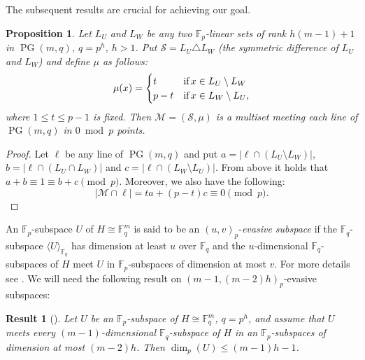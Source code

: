 \documentclass[12pt]{article}
\newcommand{\cM}{{\mathcal M}}
\newcommand{\cS}{{\mathcal S}}
\newcommand{\F}{{\mathbb F}}
\newtheorem{proposition}[theorem]{Proposition}
\newtheorem{result}[theorem]{Result}
\DeclareMathOperator{\PG}{{PG}}
\begin{document}
The subsequent results are crucial for achieving our goal.

\begin{proposition}
	\label{prop1}
	Let $L_U$ and $L_W$ be any two $\F_p$-linear sets of rank $h(m-1)+1$ in $\PG(m,q)$, $q=p^h$, $h>1$. Put $\cS=L_U \triangle L_W$ (the symmetric difference of $L_U$ and $L_W$) and define $\mu$ as follows:
	\begin{equation}\label{value}
		\mu(x)=
		\begin{cases}
			t & \textnormal{if} \, x \in L_U \setminus L_W\\ 
			p-t & \textnormal{if} \, x\in L_W\setminus L_U,
		\end{cases}
	\end{equation}
	where $1 \leq t \leq p-1$ is fixed. Then $\cM=(\cS,\mu)$ is a multiset meeting each line of $\PG(m,q)$ in $0 \bmod p$ points.
\end{proposition}
\begin{proof}
	Let $\ell$ be any line of $\PG(m,q)$ and put $a=|\ell \cap (L_U\setminus L_W)|$, $b=|\ell \cap (L_U \cap L_W)|$ and $c=|\ell \cap (L_W\setminus L_U)|$. From above it holds that $a+b\equiv 1 \equiv b+c  \pmod p$. Moreover, we also have the following:
	\begin{equation*}
		|\cM \cap \ell|= ta+(p-t)c\equiv 0 \pmod p.
	\end{equation*}
\end{proof}

An $\F_p$-subspace $U$ of $H\cong \F_q^m$ is said to be an $(u,v)_p$-\textit{evasive subspace} if the $\F_q$-subspace $ \langle U \rangle_{\F_{q}}$ has dimension at least $u$ over $\F_q$ and the $u$‐dimensional $\F_q$-subspaces of $H$ meet $U$ in  $\F_p$‐subspaces of dimension at most $v$. For more details see \cite{evasive}. We will need the following result on $(m-1,(m-2)h)_p$-evasive subspaces: 

\begin{result}[{\cite[Special case of Corollary 4.4]{evasive}}]
	\label{eva}
	Let $U$ be an $\F_p$-subspace of $H\cong \F_q^m$, $q=p^h$, and assume that $U$ meets every $(m-1)$-dimensional $\F_q$-subspace of $H$ in an $\F_p$-subspaces of dimension at most $(m-2)h$. Then $\dim_p (U) \leq (m-1)h-1$.
\end{result}
\end{document}
